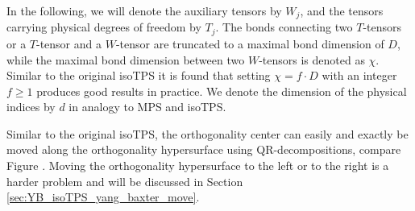 In the following, we will denote the auxiliary tensors by $W_j$, and the tensors carrying physical degrees of freedom by $T_j$. The bonds connecting two $T$-tensors or a $T$-tensor and a $W$-tensor are truncated to a maximal bond dimension of $D$, while the maximal bond dimension between two $W$-tensors is denoted as $\chi$. Similar to the original isoTPS it is found that setting $\chi=f\cdot D$ with an integer $f\ge1$ produces good results in practice. We denote the dimension of the physical indices by $d$ in analogy to MPS and isoTPS. \par
Similar to the original isoTPS, the orthogonality center can easily and exactly be moved along the orthogonality hypersurface using QR-decompositions, compare Figure . Moving the orthogonality hypersurface to the left or to the right is a harder problem and will be discussed in Section \ref{sec:YB_isoTPS_yang_baxter_move}. \par
